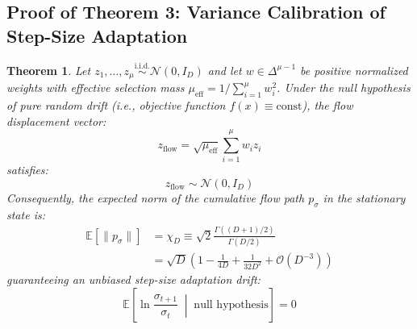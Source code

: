 \documentclass[10pt,journal,compsoc]{IEEEtran}
\newtheorem{theorem}{Theorem}
\begin{document}
\subsection{Proof of Theorem 3: Variance Calibration of Step-Size Adaptation}
\begin{theorem}
Let $z_1, \dots, z_\mu \overset{\text{i.i.d.}}{\sim} \mathcal{N}(0, I_D)$ and let $w \in \Delta^{\mu-1}$ be positive normalized weights with effective selection mass $\mu_{\text{eff}} = 1 / \sum_{i=1}^\mu w_i^2$. Under the null hypothesis of pure random drift (i.e., objective function $f(x) \equiv \text{const}$), the flow displacement vector:
\begin{equation}
z_{\text{flow}} = \sqrt{\mu_{\text{eff}}} \sum_{i=1}^\mu w_i z_i
\end{equation}
satisfies:
\begin{equation}
z_{\text{flow}} \sim \mathcal{N}(0, I_D)
\end{equation}
Consequently, the expected norm of the cumulative flow path $p_\sigma$ in the stationary state is:
\begin{align}
\mathbb{E}[\|p_\sigma\|] &= \chi_D \equiv \sqrt{2} \frac{\Gamma((D+1)/2)}{\Gamma(D/2)} \nonumber \\
&= \sqrt{D} \left(1 - \frac{1}{4D} + \frac{1}{32D^2} + \mathcal{O}(D^{-3})\right)
\end{align}
guaranteeing an unbiased step-size adaptation drift:
\begin{equation}
\mathbb{E}\left[\ln \frac{\sigma_{t+1}}{\sigma_t} \;\middle|\; \text{null hypothesis}\right] = 0
\end{equation}
\end{theorem}
\end{document}
